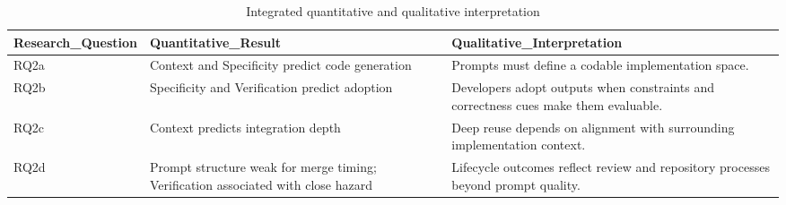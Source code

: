 \begin{table}
\caption{Integrated quantitative and qualitative interpretation}
\label{tab:triangulation}
\begin{tabular}{lll}
\toprule
Research\_Question & Quantitative\_Result & Qualitative\_Interpretation \\
\midrule
RQ2a & Context and Specificity predict code generation & Prompts must define a codable implementation space. \\
RQ2b & Specificity and Verification predict adoption & Developers adopt outputs when constraints and correctness cues make them evaluable. \\
RQ2c & Context predicts integration depth & Deep reuse depends on alignment with surrounding implementation context. \\
RQ2d & Prompt structure weak for merge timing; Verification associated with close hazard & Lifecycle outcomes reflect review and repository processes beyond prompt quality. \\
\bottomrule
\end{tabular}
\end{table}

